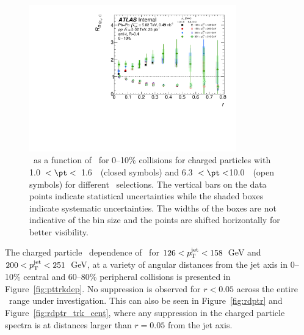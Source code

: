 \begin{figure}[ht]
\centerline{
\includegraphics[width=0.8\textwidth]{figures/results/RDpT_dR_trk2_trk6_cent0.pdf} 
}
\caption{\RDptr\ as a function of \rvar\ for 0--10\% collisions for charged particles with 1.0~$< \pt <$~1.6~\GeV\
(closed symbols) and 6.3~$< \pt <$10.0~\GeV\ (open symbols) for different \ptjet\ selections. The vertical bars on the data points indicate statistical uncertainties while the shaded boxes indicate systematic uncertainties. The widths of the boxes are not indicative of the bin size and the points are shifted horizontally for better visibility.}
\label{fig:ptjetdep}
\end{figure}


The charged particle \pt\ dependence of \RDptr\ for \mbox{$126 < \mbox{$p_{\mathrm{T}}^{\mathrm{jet}}$} < 158$ GeV} and \mbox{$200 < \mbox{$p_{\mathrm{T}}^{\mathrm{jet}}$} < 251$ GeV}, at a variety of angular distances from the jet axis in 0--10\% central and 60--80\% peripheral collisions is presented in Figure~\ref{fig:pttrkdep}. No suppression is observed for $r < 0.05$ across the entire \pt\ range under investigation. This can also be seen in Figure~\ref{fig:rdptr} and Figure~\ref{fig:rdptr_trk_cent}, where any suppression in the charged particle spectra is at distances larger than $r = 0.05 $ 
from the jet axis. 


